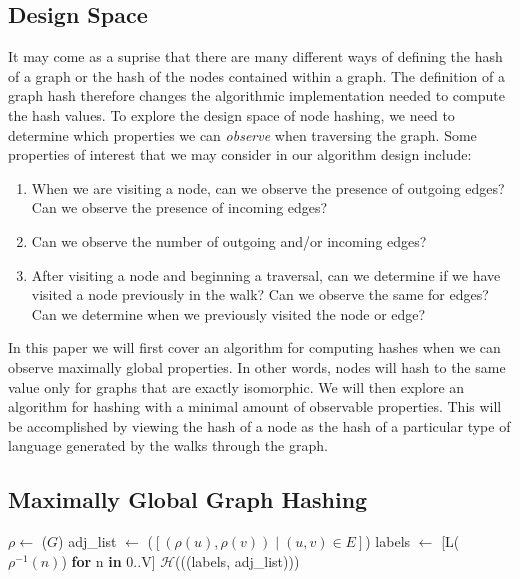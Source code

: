 \documentclass{svproc}
\begin{document}
\subsection{Design Space}

It may come as a suprise that there are many different ways of defining the hash of a graph or the hash of the nodes contained within a graph. The definition of a graph hash therefore changes the algorithmic implementation needed to compute the hash values. To explore the design space of node hashing, we need to determine which properties we can \textit{observe} when traversing the graph. Some properties of interest that we may consider in our algorithm design include:

\begin{enumerate}
  \item When we are visiting a node, can we observe the presence of outgoing edges? Can we observe the presence of incoming edges?
  \item Can we observe the number of outgoing and/or incoming edges?
  \item After visiting a node and beginning a traversal, can we determine if we have visited a node previously in the walk? Can we observe the same for edges? Can we determine when we previously visited the node or edge?
\end{enumerate}

In this paper we will first cover an algorithm for computing hashes when we can observe maximally global properties. In other words, nodes will hash to the same value only for graphs that are exactly isomorphic. We will then explore an algorithm for hashing with a minimal amount of observable properties. This will be accomplished by viewing the hash of a node as the hash of a particular type of language generated by the walks through the graph.

\subsection{Maximally Global Graph Hashing}

\begin{algorithm}
    \caption{Directed Graph Hash}\label{digraphhash}
    \begin{algorithmic}[1]
        \State {}
        \State $\rho \gets$ ($G$) 
        \State adj\_list $\gets$ ($[(\rho(u), \rho(v)) \mid (u,v) \in E]$)
        \State labels $\gets$ [L($\rho^{-1}(n)$) \textbf{for} n \textbf{in} 0..\textbar V\textbar]
        \State \Return $\mathcal{H}$(((labels, adj\_list))) 
    \EndFunction
    \end{algorithmic}
\end{algorithm}
\end{document}
